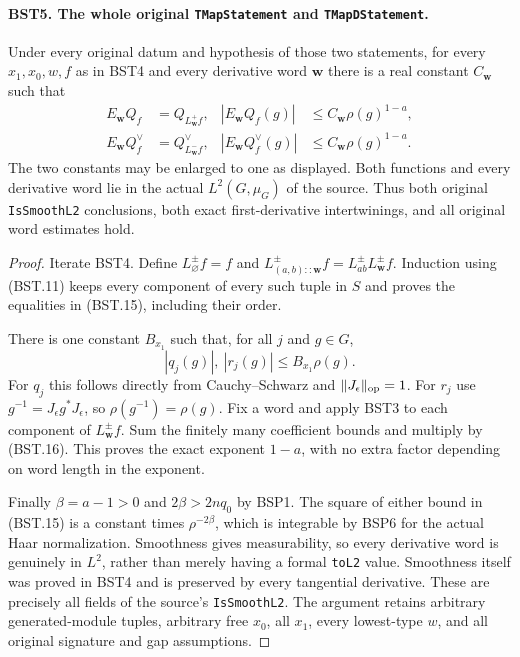 \paragraph{BST5. The whole original \texttt{TMapStatement} and \texttt{TMapDStatement}.}
\label{claim:BST5}
Under every original datum and hypothesis of those two statements,
for every $x_1,x_0,w,f$ as in BST4 and every derivative word
$\mathbf w$ there is a real constant $C_{\mathbf w}$ such that
\[
 \begin{aligned}
 E_{\mathbf w}Q_f&=Q_{L_{\mathbf w}^{+}f},
 &|E_{\mathbf w}Q_f(g)|&\le C_{\mathbf w}\rho(g)^{1-a},\\
 E_{\mathbf w}Q_f^\vee&=Q_{L_{\mathbf w}^{-}f}^\vee,
 &|E_{\mathbf w}Q_f^\vee(g)|&\le C_{\mathbf w}\rho(g)^{1-a}.
 \end{aligned}
 \tag{BST.15}
\]
The two constants may be enlarged to one as displayed.
Both functions and every derivative word lie in the actual
$L^2(G,\mu_G)$ of the source.  Thus both original
\texttt{IsSmoothL2} conclusions, both exact first-derivative
intertwinings, and all original word estimates hold.

\begin{proof}
Iterate BST4.  Define
$L_\varnothing^\pm f=f$ and
$L_{(a,b)::\mathbf w}^\pm f=L_{ab}^\pm L_{\mathbf w}^\pm f$.
Induction using (BST.11) keeps every component of every such tuple
in $S$ and proves the equalities in (BST.15), including their order.

There is one constant $B_{x_1}$ such that, for all $j$ and $g\in G$,
\[
                    |q_j(g)|,\ |r_j(g)|\le B_{x_1}\rho(g).
 \tag{BST.16}
\]
For $q_j$ this follows directly from Cauchy--Schwarz and
$\|J_\epsilon\|_{\rm op}=1$.  For $r_j$ use
$g^{-1}=J_\epsilon g^*J_\epsilon$, so
$\rho(g^{-1})=\rho(g)$.
Fix a word and apply BST3 to each component of
$L_{\mathbf w}^\pm f$.  Sum the finitely many coefficient bounds
and multiply by (BST.16).  This proves the exact exponent $1-a$,
with no extra factor depending on word length in the exponent.

Finally $\beta=a-1>0$ and $2\beta>2nq_0$ by BSP1.
The square of either bound in (BST.15) is a constant times
$\rho^{-2\beta}$, which is integrable by BSP6 for the actual Haar
normalization.  Smoothness gives measurability, so every derivative
word is genuinely in $L^2$, rather than merely having a formal
\texttt{toL2} value.  Smoothness itself was proved in BST4 and is
preserved by every tangential derivative.  These are precisely all
fields of the source's \texttt{IsSmoothL2}.
The argument retains arbitrary generated-module tuples, arbitrary
free $x_0$, all $x_1$, every lowest-type $w$, and all original
signature and gap assumptions.
\end{proof}

